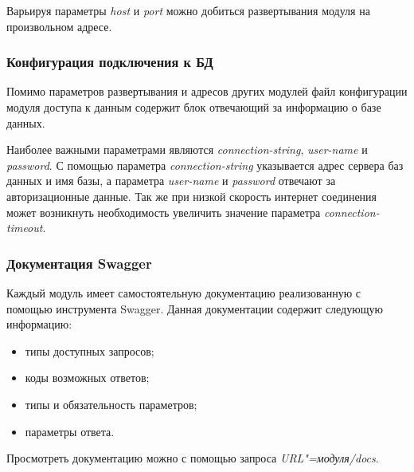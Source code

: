 

Варьируя параметры \emph{host} и \emph{port} можно добиться развертывания модуля на произвольном адресе.

\subsubsection{Конфигурация подключения к БД}
Помимо параметров развертывания и адресов других модулей файл конфигурации модуля доступа к данным содержит блок отвечающий за информацию о базе данных.



Наиболее важными параметрами являются \emph{connection-string}, \emph{user-name} и \emph{password}. С помощью параметра \emph{connection-string} указывается адрес сервера баз данных и имя базы, а параметра \emph{user-name} и \emph{password} отвечают за авторизационные данные. Так же при низкой скорость интернет соединения может возникнуть необходимость увеличить значение параметра \emph{connection-timeout}.

\subsubsection{Документация Swagger}
Каждый модуль имеет самостоятельную документацию реализованную с помощью инструмента Swagger.
Данная документации содержит следующую информацию:
\begin{itemize}
    \item типы доступных запросов;
    \item коды возможных ответов;
    \item типы и обязательность параметров;
    \item параметры ответа.
\end{itemize}

Просмотреть документацию можно с помощью запроса \mbox{\emph{URL"=модуля/docs}}.